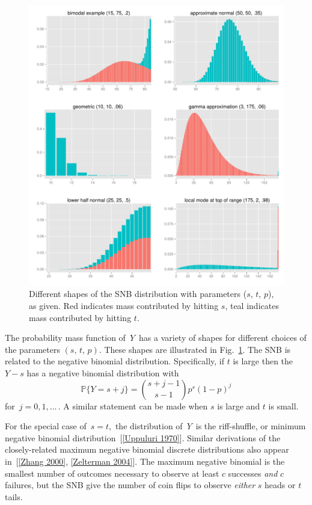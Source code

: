 \documentclass[12pt]{article}         %
\begin{document}
\begin{figure}[p!]
\begin{center}
\includegraphics[width=\textwidth]{shapes.pdf}
\end{center}
\caption{Different shapes of the SNB distribution with parameters ($s$, $t$, $p$), as given. Red indicates mass contributed by hitting $s$, teal indicates
mass contributed by hitting $t$. \label{shapes.fig}}
\end{figure}

The probability mass function of $\,Y\,$ has a variety of shapes for different choices of the parameters $(s,\, t,\,p)$.
These shapes are illustrated in Fig.~\ref{shapes.fig}.
The SNB is related to the negative binomial distribution. Specifically, if 
$t$ is large then the $Y-s$ has a negative binomial distribution 
with
\begin{equation*}                                    %
   \mathbb{P}\{Y=s+j \}        \label{nb1.eq}
          = {{s+j-1}\choose{s-1}} p^s (1-p)^j
\end{equation*}
for $\,j=0, 1,\ldots\,$. A similar statement can be made when $s$ is large
and $t$ is small.

For the special case of $\,s=t,$ the distribution of $\,Y\,$ is the 
riff-shuffle, or minimum negative binomial distribution~[\ref{Uppuluri 1970}].
Similar derivations of the closely-related maximum negative binomial discrete 
distributions also appear in~[\ref{Zhang 2000}, \ref{Zelterman 2004}]. 
The maximum negative binomial is the smallest number of outcomes necessary
to observe at least $c$ successes {\em and} $c$ failures, but the SNB give
the number of coin flips to observe {\em either} $s$ heads or $t$ tails.
\end{document}
